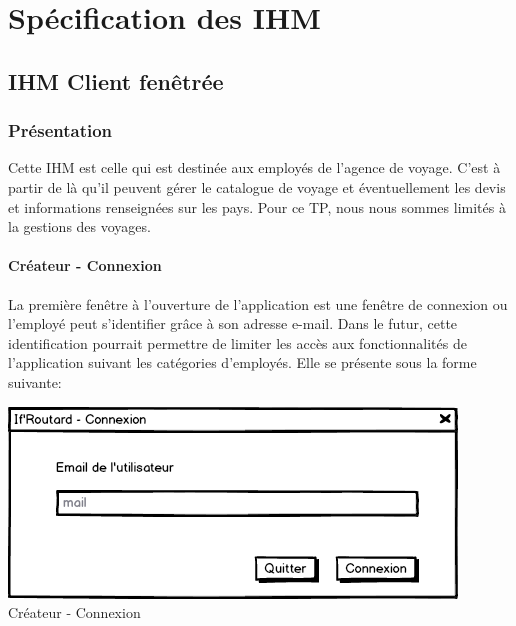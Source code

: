 \documentclass[12pt]{article}
\begin{document}
\section{Spécification des IHM}
\subsection{IHM Client fenêtrée}
\subsubsection{Présentation}
Cette IHM est celle qui est destinée aux employés de l'agence de voyage. C'est à partir de là qu'il peuvent gérer le catalogue de voyage et éventuellement les devis et informations renseignées sur les pays. Pour ce TP, nous nous sommes limités à  la gestions des voyages. 
\paragraph{Créateur - Connexion}
La première fenêtre à l'ouverture de l'application est une fenêtre de connexion ou l'employé peut s'identifier grâce à son adresse e-mail. Dans le futur, cette identification pourrait permettre de limiter les accès aux fonctionnalités de l'application suivant les catégories d'employés. Elle se présente sous la forme suivante:
\begin{center}
\includegraphics[scale = 0.5]{../Conception_graphique/png_Pour_CR/Createur-00-Connexion.png}
\newline
Créateur - Connexion
\label{fig:Cr-Connexion}
\end{center}
\end{document}
